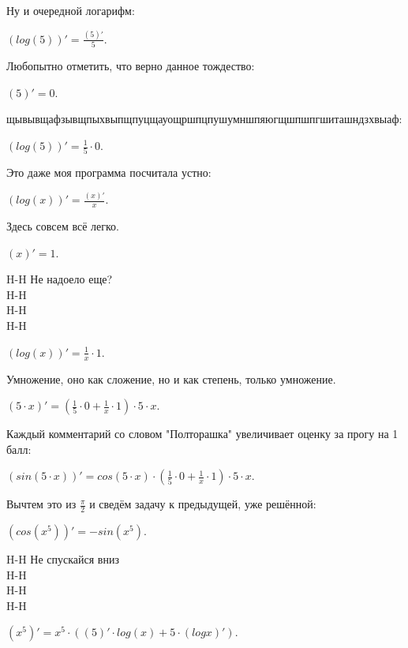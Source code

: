\documentclass{article}
\begin{document}
Ну и очередной логарифм:\\
\begin{center}$(log({5}))'= \frac { ({5})'} {{5}}$.\end{center}
Любопытно отметить, что верно данное тождество:\\
\begin{center}$({5})' = 0$.\end{center}
щывывщафзывщпыхвыпщпуцщауощршпцпушумншпяюгщшпшпгшиташндзхвыаф:\\
\begin{center}$(log({5}))'=  \frac {1} {{{5}}} \cdot {0}$.\end{center}
Это даже моя программа посчитала устно:\\
\begin{center}$(log(x))'= \frac { (x)'} {x}$.\end{center}
Здесь совсем всё легко.\\
\begin{center}$(x)' = 1$.\end{center}
H-H Не надоело еще?\\
H-H\\
H-H\\
H-H\\
\begin{center}$(log(x))'=  \frac {1} {{x}} \cdot {1}$.\end{center}
Умножение, оно как сложение, но и как степень, только умножение.\\
\begin{center}$({5} \cdot x)'= ( \frac {1} {{{5}}} \cdot {0}+ \frac {1} {{x}} \cdot {1}) \cdot {5} \cdot x$.\end{center}
Каждый комментарий со словом "Полторашка" увеличивает оценку за прогу на 1 балл:\\
\begin{center}$(sin({5} \cdot x))'= cos({5} \cdot x) \cdot ( \frac {1} {{{5}}} \cdot {0}+ \frac {1} {{x}} \cdot {1}) \cdot {5} \cdot x$.\end{center}
Вычтем это из $\frac {\pi} {2}$ и сведём задачу к предыдущей, уже решённой:\\
\begin{center}$(cos({x^{{5}}}))'= -sin({x^{{5}}})$.\end{center}
H-H Не спускайся вниз\\
H-H\\
H-H\\
H-H\\
\begin{center}$({x^{{5}}})'={x^{{5}}} \cdot (({{5}})'\cdot log(x) + {{5}} \cdot (logx)')$.\end{center}
\end{document}
